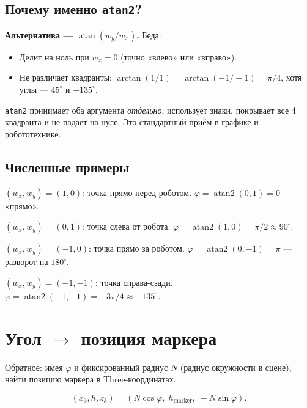 \subsection{Почему именно \texttt{atan2}?}

\begin{ideabox}
\textbf{Альтернатива --- $\operatorname{atan}(w_y/w_x)$.} Беда:
\begin{itemize}
  \item Делит на ноль при $w_x = 0$ (точно «влево» или «вправо»).
  \item Не различает квадранты: $\arctan(1/1) = \arctan(-1/-1) = \pi/4$,
        хотя углы --- $45^\circ$ и $-135^\circ$.
\end{itemize}

\texttt{atan2} принимает оба аргумента \emph{отдельно}, использует знаки,
покрывает все 4 квадранта и не падает на нуле. Это стандартный приём в
графике и робототехнике.
\end{ideabox}

\subsection{Численные примеры}

\begin{examplebox}
$(w_x, w_y) = (1, 0)$: точка прямо перед роботом. $\varphi = \operatorname{atan2}(0, 1) = 0$ --- «прямо».

$(w_x, w_y) = (0, 1)$: точка слева от робота. $\varphi = \operatorname{atan2}(1, 0) = \pi/2 \approx 90^\circ$.

$(w_x, w_y) = (-1, 0)$: точка прямо за роботом. $\varphi = \operatorname{atan2}(0, -1) = \pi$ --- разворот на $180^\circ$.

$(w_x, w_y) = (-1, -1)$: точка справа-сзади. $\varphi = \operatorname{atan2}(-1, -1) = -3\pi/4 \approx -135^\circ$.
\end{examplebox}

\section{Угол \texorpdfstring{$\to$}{->} позиция маркера}

Обратное: имея $\varphi$ и фиксированный радиус $N$ (радиус окружности
в сцене), найти позицию маркера в Three-координатах.

\begin{formulabox}[title={Маркер на окружности радиуса $N$}]
\begin{equation}
  (x_3, h, z_3) = (N\cos\varphi,\; h_\text{marker},\; -N\sin\varphi).
  \label{eq:angle_to_pos}
\end{equation}
\end{formulabox}

